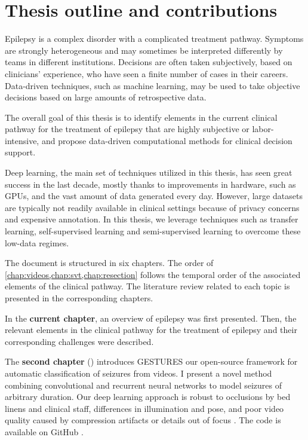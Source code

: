 \section{Thesis outline and contributions}


Epilepsy is a complex disorder with a complicated treatment pathway.
Symptoms are strongly heterogeneous and may sometimes be interpreted differently by teams in different institutions.
Decisions are often taken subjectively, based on clinicians' experience, who have seen a finite number of cases in their careers.
Data-driven techniques, such as machine learning, may be used to take objective decisions based on large amounts of retrospective data.

The overall goal of this thesis is to identify elements in the current clinical pathway for the treatment of epilepsy that are highly subjective or labor-intensive, and propose data-driven computational methods for clinical decision support.

Deep learning, the main set of techniques utilized in this thesis, has seen great success in the last decade, mostly thanks to improvements in hardware, such as \acp{GPU}, and the vast amount of data generated every day.
However, large datasets are typically not readily available in clinical settings because of privacy concerns and expensive annotation.
In this thesis, we leverage techniques such as transfer learning, self-supervised learning and semi-supervised learning to overcome these low-data regimes.

The document is structured in six chapters.
The order of \cref{chap:videos,chap:svt,chap:resection} follows the temporal order of the associated elements of the clinical pathway.
The literature review related to each topic is presented in the corresponding chapters.


In the \textbf{current chapter}, an overview of epilepsy was first presented.
Then, the relevant elements in the clinical pathway for the treatment of epilepsy and their corresponding challenges were described.


The \textbf{second chapter} () introduces \ac{GESTURES} our open-source framework for automatic classification of seizures from videos.
I present a novel method combining convolutional and recurrent neural networks to model seizures of arbitrary duration.
Our deep learning approach is robust to occlusions by bed linens and clinical staff, differences in illumination and pose, and poor video quality caused by compression artifacts or details out of focus \cite{perez-garcia_transfer_2021}.
The code is available on GitHub%
.

